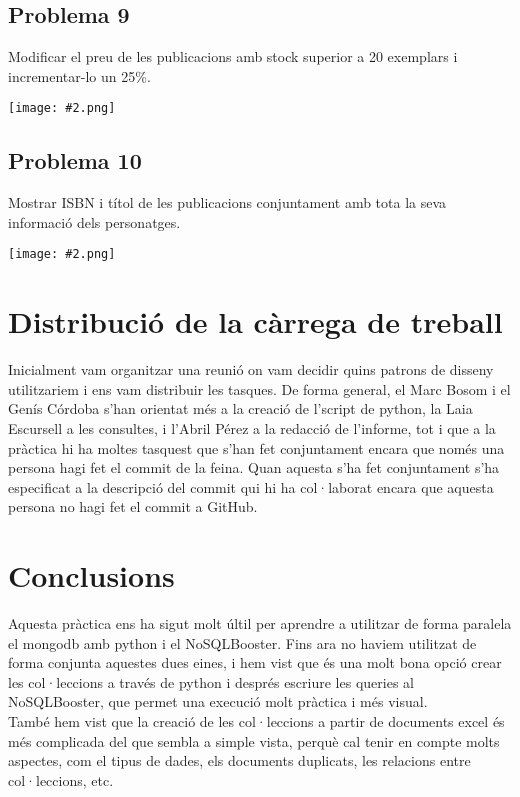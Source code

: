 \documentclass{article}
\newcommand{\imatge}[2]{
\begin{center}
    \texttt{[image: \#2.png]}
\end{center}
}
\begin{document}
\subsection*{Problema 9}
Modificar el preu de les publicacions amb stock superior a 20 exemplars i incrementar-lo un 25\%.
\imatge{1}{9}
\subsection*{Problema 10}
Mostrar ISBN i títol de les publicacions conjuntament amb tota la seva informació dels personatges.
\imatge{1}{10}

\section{Distribuci\'o de la c\`arrega de treball}
Inicialment vam organitzar una reuni\'o on vam decidir quins patrons de disseny utilitzariem i ens vam distribuir les tasques. De forma general, el Marc Bosom i el Gen\'is C\'ordoba s'han orientat m\'es a la creaci\'o de l'script de python, la Laia Escursell a les consultes, i l'Abril P\'erez a la redacci\'o de l'informe, tot i que a la pr\`actica hi ha moltes tasquest que s'han fet conjuntament encara que nom\'es una persona hagi fet el commit de la feina. Quan aquesta s'ha fet conjuntament s'ha especificat a la descripci\'o del commit qui hi ha col·laborat encara que aquesta persona no hagi fet el commit a GitHub.

\section{Conclusions}
Aquesta pr\`actica ens ha sigut molt \'ultil per aprendre a utilitzar de forma paralela el mongodb amb python i el NoSQLBooster. Fins ara no haviem utilitzat de forma conjunta aquestes dues eines, i hem vist que \'es una molt bona opci\'o crear les col·leccions a trav\'es de python i despr\'es escriure les queries al NoSQLBooster, que permet una execuci\'o molt pr\`actica i m\'es visual.\\
Tamb\'e hem vist que la creaci\'o de les col·leccions a partir de documents excel \'es m\'es complicada del que sembla a simple vista, perqu\`e cal tenir en compte molts aspectes, com el tipus de dades, els documents duplicats, les relacions entre col·leccions, etc.
\end{document}
